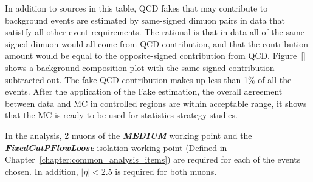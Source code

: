 In addition to sources in this table, QCD fakes that may contribute to background events are estimated by same-signed dimuon pairs in data that satistfy all other event requirements. The rational is that in data all of the same-signed dimuon would all come from QCD contribution, and that the contribution amount would be equal to the opposite-signed contribution from QCD. Figure~\ref{} shows a background composition plot with the same signed contribution subtracted out. The fake QCD contribution makes up less than 1\% of all the events. After the application of the Fake estimation, the overall agreement between data and MC in controlled regions are within acceptable range, it shows that the MC is ready to be used for statistics strategy studies.

In the analysis, 2 muons of the \textbf{\textit{MEDIUM}} working point and the \textbf{\textit{FixedCutPFlowLoose}} isolation working point (Defined in Chapter~\ref{chapter:common_analysis_items}) are required for each of the events chosen. In addition, $|\eta|< 2.5$ is required for both muons. 






%

